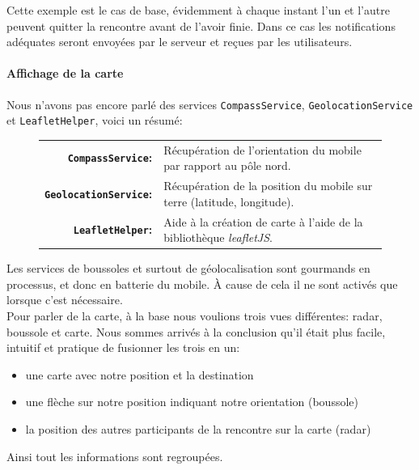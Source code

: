 \documentclass[french]{article}
\begin{document}
	Cette exemple est le cas de base, évidemment à chaque instant l'un et l'autre peuvent quitter la rencontre avant de l'avoir finie. Dans ce cas les notifications adéquates seront envoyées par le serveur et reçues par les utilisateurs. 
	
	\paragraph{Affichage de la carte}
	
	Nous n'avons pas encore parlé des services \texttt{CompassService}, \texttt{GeolocationService} et \texttt{LeafletHelper}, voici un résumé:
	\begin{figure}[H]
		\centering
		\begin{tabular}{rl}
			\textbf{\texttt{CompassService}:} & Récupération de l'orientation du mobile par rapport au pôle nord.\\
			\textbf{\texttt{GeolocationService}:} & Récupération de la position du mobile sur terre (latitude, longitude).\\
			\textbf{\texttt{LeafletHelper}:} & Aide à la création de carte à l'aide de la bibliothèque \textit{leafletJS}.\\
		\end{tabular}
	\end{figure}
	Les services de boussoles et surtout de géolocalisation sont gourmands en processus, et donc en batterie du mobile. À cause de cela il ne sont activés que lorsque c'est nécessaire.\\
	
	Pour parler de la carte, à la base nous voulions trois vues différentes: radar, boussole et carte. Nous sommes arrivés à la conclusion qu'il était plus facile, intuitif et pratique de fusionner les trois en un:
	\begin{itemize}
		\item une carte avec notre position et la destination
		\item une flèche sur notre position indiquant notre orientation (boussole)
		\item la position des autres participants de la rencontre sur la carte (radar)
	\end{itemize}
	Ainsi tout les informations sont regroupées.\\
	
\end{document}
